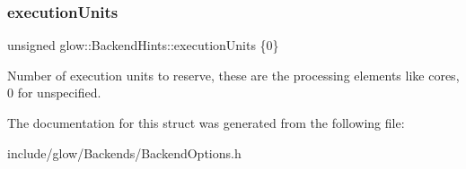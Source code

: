 \subsubsection{\texorpdfstring{execution\+Units}{executionUnits}}
{\footnotesize\ttfamily unsigned glow\+::\+Backend\+Hints\+::execution\+Units \{0\}}

Number of execution units to reserve, these are the processing elements like cores, 0 for unspecified. 

The documentation for this struct was generated from the following file\+:\begin{DoxyCompactItemize}
\item 
include/glow/\+Backends/Backend\+Options.\+h\end{DoxyCompactItemize}
